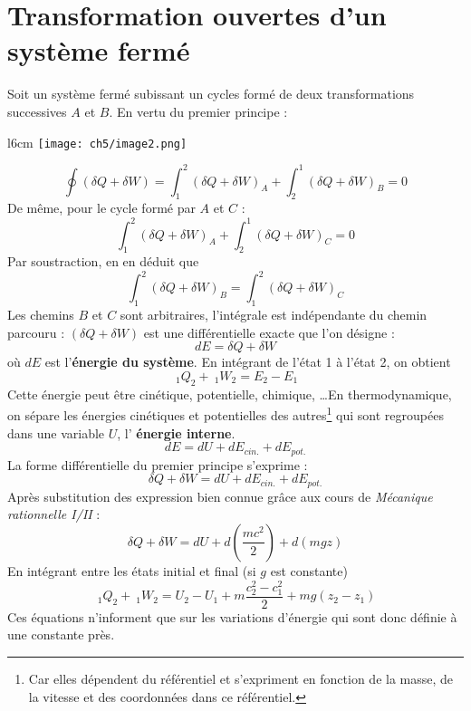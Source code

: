 \section{Transformation ouvertes d'un système fermé}
Soit un système fermé subissant un cycles formé de deux transformations 
successives $A$ et $B$. En vertu du premier principe :\\
\begin{wrapfigure}[9]{l}{6cm}
	\vspace{-7mm}
	\texttt{[image: ch5/image2.png]}
\end{wrapfigure}
\vspace{-1cm}
\begin{equation}
	\oint (\delta Q + \delta W) = \int_1^2 (\delta Q + \delta W)_A + \int_2^1 
	(\delta Q + \delta W)_B = 0
\end{equation}
De même, pour le cycle formé par $A$ et $C$ :
\begin{equation}
	\int_1^2 (\delta Q + \delta W)_A + \int_2^1 (\delta Q + \delta W)_C = 0
\end{equation}
Par soustraction, en en déduit que
\begin{equation}
	\int_1^2 (\delta Q + \delta W)_B = \int_1^2 (\delta Q + \delta W)_C
\end{equation}
Les chemins $B$ et $C$ sont arbitraires, l'intégrale est indépendante 
du chemin parcouru : $(\delta Q + \delta W)$ est une différentielle 
exacte que l'on désigne :
\begin{equation}
	dE = \delta Q + \delta W
\end{equation}
où $dE$ est l'\textbf{énergie du système}. En intégrant de l'état 1 à 
l'état 2, on obtient
\begin{equation}
	\ _1Q_2 + \ _1W_2 = E_2-E_1
\end{equation}
Cette énergie peut être cinétique, potentielle, chimique, \dots En 
thermodynamique, on sépare les énergies cinétiques et potentielles 
des autres\footnote{Car elles dépendent du référentiel et s'expriment 
	en fonction de la masse, de la vitesse et des coordonnées dans ce 
	référentiel.} qui sont regroupées dans une variable $U$, l'\textbf{
énergie interne}.
\begin{equation}
	dE = dU + dE_{cin.} + dE_{pot.}
\end{equation}
La forme différentielle du premier principe s'exprime :
\begin{equation}
	\delta Q + \delta W = dU + dE_{cin.} + dE_{pot.}
\end{equation}
Après substitution des expression bien connue grâce aux cours de \textit{
Mécanique rationnelle I/II} : 
\begin{equation}
	\delta Q + \delta W = dU + d\left(\frac{mc^2}{2}\right) + d(mgz)
\end{equation}
En intégrant entre les états initial et final (si $g$ est constante)
\begin{equation}
	\ _1Q_2 + \ _1W_2 = U_2 - U_1 + m\frac{c_2^2-c_1^2}{2}+mg(z_2-z_1)
\end{equation}
Ces équations n'informent que sur les variations d'énergie qui sont 
donc définie à une constante près.

